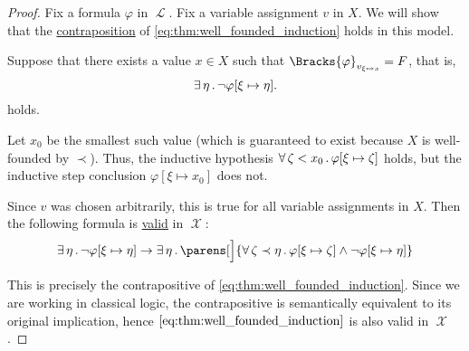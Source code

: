 \begin{proof}
  Fix a formula \( \varphi \) in \( \mscrL \). Fix a variable assignment \( v \) in \( X \). We will show that the \hyperref[def:material_implication/contrapositive]{contraposition} of \eqref{eq:thm:well_founded_induction} holds in this model.

  Suppose that there exists a value \( x \in X \) such that \( \Bracks{\varphi}_{v_{\xi \mapsto x}} = F \), that is,
  \begin{equation*}
    \exists \thinspace \eta \thinspace . \thinspace \neg \varphi[\xi \mapsto \eta].
  \end{equation*}
  holds.

  Let \( x_0 \) be the smallest such value (which is guaranteed to exist because \( X \) is well-founded by \( \prec \)). Thus, the inductive hypothesis \( \forall \thinspace \zeta < x_0 \thinspace . \thinspace \varphi[\xi \mapsto \zeta] \) holds, but the inductive step conclusion \( \varphi[\xi \mapsto x_0] \) does not.

  Since \( v \) was chosen arbitrarily, this is true for all variable assignments in \( X \). Then the following formula is \hyperref[def:first_order_model]{valid} in \( \mscrX \):
  \begin{equation}\label{eq:thm:well_founded_induction/contraposition}
    \qexists \eta \neg \varphi[\xi \mapsto \eta]
    \rightarrow
    \qexists \eta
    \parens[\Big]
      {
        \qforall {\zeta \prec \eta} \varphi[\xi \mapsto \zeta] \wedge \neg \varphi[\xi \mapsto \eta]
      }
  \end{equation}

  This is precisely the contrapositive of \eqref{eq:thm:well_founded_induction}. Since we are working in classical logic, the contrapositive is semantically equivalent to its original implication, hence \( \eqref{eq:thm:well_founded_induction} \) is also valid in \( \mscrX \).
\end{proof}


